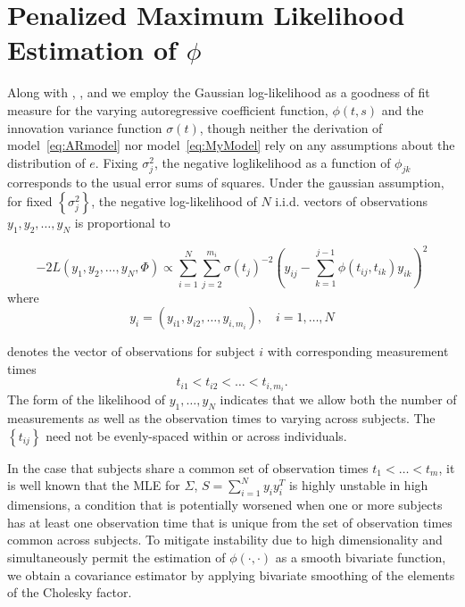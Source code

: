 \documentclass[12pt]{article}
\theoremstyle{definition}
\begin{document}
\section{Penalized Maximum Likelihood Estimation of $\phi$}

Along with \citet{huang2006covariance}, \citet{levina2008sparse}, and \citet{pourahmadi2000maximum} we employ the Gaussian log-likelihood as a goodness of fit measure for the varying  autoregressive coefficient function, $\phi\left(t,s\right)$ and the innovation variance function $\sigma\left(t\right)$, though neither the derivation of model~\ref{eq:ARmodel} nor model~\ref{eq:MyModel} rely on any assumptions about the distribution of $e$. Fixing $\sigma_j^2$, the negative loglikelihood as a function of $\phi_{jk}$ corresponds to the usual error sums of squares.  Under the gaussian assumption, for fixed $\left\{ \sigma_j^2 \right\}$, the negative log-likelihood of $N$ i.i.d. vectors of observations $y_1,y_2,\dots,y_N$ is proportional to

\begin{equation}
-2 L\left(y_1, y_2, \dots,y_N ,\Phi \right) \propto \sum_{i=1}^N \sum_{j=2}^{m_i} \sigma\left({t_j}\right)^{-2} \left(y_{ij} - \sum_{k=1}^{j-1}\phi\left({t_{ij},t_{ik}}\right)y_{ik} \right)^2 \label{loglikelihood}
\end{equation}
\noindent
where 
\[
y_i = \left( y_{i1}, y_{i2}, \dots, y_{i,m_i}\right), \quad i=1,\dots,N 
\] 

\noindent
denotes the vector of observations for subject $i$ with corresponding measurement times 
\[
t_{i1} < t_{i2} < \dots < t_{i,m_i}.
\]
The form of the likelihood of $y_1,\dots,y_N$ indicates that we allow both the number of measurements as well as the observation times to varying across subjects. The $\left\{t_{ij} \right\}$ need not be evenly-spaced within or across individuals.  

In the case that subjects share a common set of observation times $t_1 < \dots < t_m$,  it is well known that the MLE for $\Sigma$, $S = \sum_{i=1}^N y_i y_i^T$ is highly unstable in high dimensions, a condition that is potentially worsened when one or more subjects has at least one observation time that is unique from the set of observation times common across subjects. To mitigate instability due to high dimensionality and simultaneously permit the estimation of $\phi\left(\cdot,\cdot\right)$ as a smooth bivariate function, we obtain a covariance estimator by applying bivariate smoothing of the elements of the Cholesky factor. 
\end{document}
